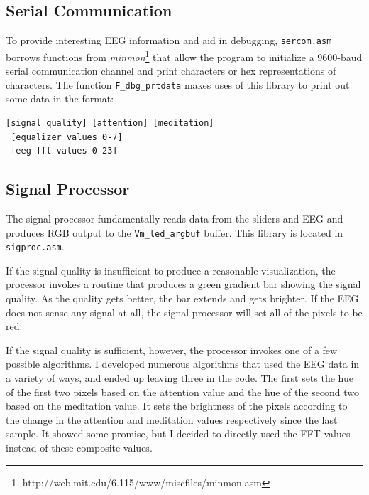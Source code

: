 \documentclass[letterpaper,10pt,notitlepage]{report}
\newcommand{\dat}[1]{\texttt{#1}}
\begin{document}
    \subsection{Serial Communication}

        To provide interesting EEG information and aid in debugging,
        \dat{sercom.asm} borrows functions from
        \emph{minmon}\footnote{http://web.mit.edu/6.115/www/miscfiles/minmon.asm}
        that allow the program to initialize a 9600-baud serial communication
        channel and print characters or hex representations of characters.  The
        function \dat{F\_dbg\_prtdata} makes uses of this library to print out
        some data in the format:

        \begin{verbatim}
[signal quality] [attention] [meditation]
 [equalizer values 0-7]
 [eeg fft values 0-23]
        \end{verbatim}

    \subsection{Signal Processor}

        The signal processor fundamentally reads data from the sliders and EEG
        and produces RGB output to the \dat{Vm\_led\_argbuf} buffer.  This
        library is located in \dat{sigproc.asm}.

        If the signal quality is insufficient to produce a reasonable
        visualization, the processor invokes a routine that produces a green
        gradient bar showing the signal quality.  As the quality gets better,
        the bar extends and gets brighter.  If the EEG does not sense any
        signal at all, the signal processor will set all of the pixels to be
        red.

        If the signal quality is sufficient, however, the processor invokes one
        of a few possible algorithms.  I developed numerous algorithms that
        used the EEG data in a variety of ways, and ended up leaving three in
        the code.  The first sets the hue of the first two pixels based on the
        attention value and the hue of the second two based on the meditation
        value.  It sets the brightness of the pixels according to the change in
        the attention and meditation values respectively since the last sample.
        It showed some promise, but I decided to directly used the FFT values
        instead of these composite values.
\end{document}
